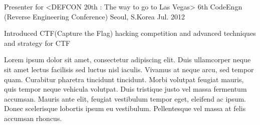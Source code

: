 \begin{cventries}

  \cventry
    {Presenter for <DEFCON 20th : The way to go to Las Vegas>} %
    {6th CodeEngn (Reverse Engineering Conference)} %
    {Seoul, S.Korea} %
    {Jul. 2012} %
    {
      \begin{cvitems} %
        \item {Introduced CTF(Capture the Flag) hacking competition and advanced techniques and strategy for CTF}
      \end{cvitems}
    }

\end{cventries}


\begin{cvparagraph}

Lorem ipsum dolor sit amet, consectetur adipiscing elit. Duis ullamcorper neque sit amet lectus facilisis sed luctus nisl iaculis. Vivamus at neque arcu, sed tempor quam. Curabitur pharetra tincidunt tincidunt. Morbi volutpat feugiat mauris, quis tempor neque vehicula volutpat. Duis tristique justo vel massa fermentum accumsan. Mauris ante elit, feugiat vestibulum tempor eget, eleifend ac ipsum. Donec scelerisque lobortis ipsum eu vestibulum. Pellentesque vel massa at felis accumsan rhoncus.
\end{cvparagraph}


